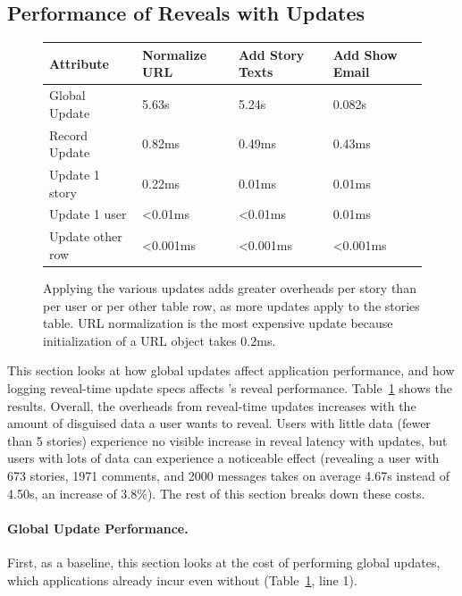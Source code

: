 \subsection{Performance of Reveals with Updates}
\label{s:eval:updates}

\begin{figure}
    \centering
    \begin{tabular}{m{}|m{}|m{}|m{}}
        \centering\textbf{Attribute} & \textbf{Normalize URL} & \textbf{Add Story Texts} &
        \textbf{Add Show Email} \\
        \hline
        Global Update & 5.63s & 5.24s & 0.082s\\
        \hline
        Record Update & 0.82ms & 0.49ms & 0.43ms \\
        \hline
        Update 1 story & 0.22ms & 0.01ms & 0.01ms \\
        \hline
        Update 1 user & <0.01ms & <0.01ms & 0.01ms \\
        \hline
        Update other row & <0.001ms & <0.001ms & <0.001ms \\
    \end{tabular}
    \caption[Overheads of global updates and reveal-time updates.]{Applying the various updates adds greater overheads per story than
    per user or per other table row, as more updates apply to the stories table.
    URL normalization is the most expensive update because initialization of a
    URL object takes 0.2ms.}
    \label{tab:updates-perf}
\end{figure}

This section looks at how global updates affect application performance, and how
logging reveal-time update specs affects \sys's reveal performance.
Table~\ref{tab:updates-perf} shows the results.
%
Overall, the overheads from reveal-time updates increases with the amount of
disguised data a user wants to reveal.
%
Users with little data (\eg fewer than 5 stories) experience no visible increase
in reveal latency with updates, but users with lots of data can experience a
noticeable effect (\eg revealing a user with 673 stories, 1971 comments, and 2000
messages takes on average 4.67s instead of 4.50s, an increase of 3.8\%).
%
The rest of this section breaks down these costs.
%

\paragraph{Global Update Performance.}
First, as a baseline, this section looks at the cost of performing
global updates, which
applications already incur even without \sys (Table~\ref{tab:updates-perf}, line 1).
%

